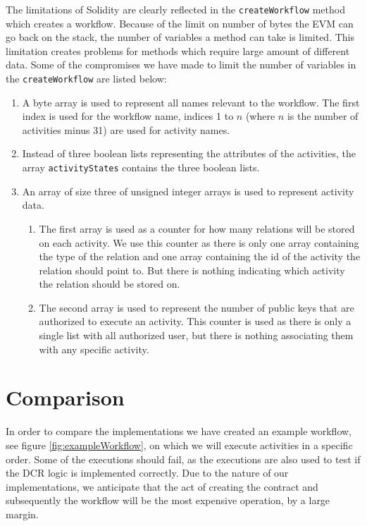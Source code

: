 \documentclass{article}
\begin{document}
	The limitations of Solidity are clearly reflected in the \texttt{createWorkflow} method which creates a workflow. 
	Because of the limit on number of bytes the EVM can go back on the stack, the number of variables a method can take is limited. 
	This limitation creates problems for methods which require large amount of different data. 
	Some of the compromises we have made to limit the number of variables in the \texttt{createWorkflow} are listed below:
	\begin{enumerate}
		\item A byte array is used to represent all names relevant to the workflow. The first index is used for the workflow name, indices 1 to $n$ (where $n$ is the number of activities minus 31) are used for activity names.
		\item Instead of three boolean lists representing the attributes of the activities, the array \texttt{activityStates} contains the three boolean lists.
		\item An array of size three of unsigned integer arrays is used to represent activity data. 
		\begin{enumerate}
			\item The first array is used as a counter for how many relations will be stored on each activity. We use this counter as there is only one array containing the type of the relation and one array containing the id of the activity the relation should point to. But there is nothing indicating which activity the relation should be stored on.
			\item The second array is used to represent the number of public keys that are authorized to execute an activity. This counter is used as there is only a single list with all authorized user, but there is nothing associating them with any specific activity.
		\end{enumerate}
	\end{enumerate}

	\section{Comparison}
	\label{sec:comparison}

	In order to compare the implementations we have created an example workflow, see figure \ref{fig:exampleWorkflow}, on which we will execute activities in a specific order. Some of the executions should fail, as the executions are also used to test if the DCR logic is implemented correctly.
	Due to the nature of our implementations, we anticipate that the act of creating the contract and subsequently the workflow will be the most expensive operation, by a large margin.
\end{document}
